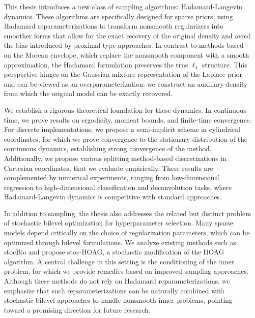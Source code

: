 \documentclass[11pt, twoside]{report}
\begin{document}
This thesis introduces a new class of sampling algorithms: Hadamard-Langevin dynamics. These algorithms are specifically designed for sparse priors, using Hadamard reparameterizations to transform nonsmooth regularizers into smoother forms that allow for the exact recovery of the original density and avoid the bias introduced by proximal-type approaches. In contrast to methods based on the Moreau envelope, which replace the nonsmooth component with a smooth approximation, the Hadamard formulation preserves the true $\ell_1$ structure. This perspective hinges on the Gaussian mixture representation of the Laplace prior and can be viewed as an overparameterization: we construct an auxiliary density from which the original model can be exactly recovered.

We establish a rigorous theoretical foundation for these dynamics. In continuous time, we prove results on ergodicity, moment bounds, and finite-time convergence. For discrete implementations, we propose a semi-implicit scheme in cylindrical coordinates, for which we prove convergence to the stationary distribution of the continuous dynamics, establishing strong convergence of the method. Additionally, we propose various splitting method-based discretizations in Cartesian coordinates, that we evaluate empirically. These results are complemented by numerical experiments, ranging from low-dimensional regression to high-dimensional classification and deconvolution tasks, where Hadamard-Langevin dynamics is competitive with standard approaches.

In addition to sampling, the thesis also addresses the related but distinct problem of stochastic bilevel optimization for hyperparameter selection. Many sparse models depend critically on the choice of regularization parameters, which can be optimized through bilevel formulations. We analyze existing methods such as stocBio and propose stoc-HOAG, a stochastic modification of the HOAG algorithm. A central challenge in this setting is the conditioning of the inner problem, for which we provide remedies based on improved sampling approaches. Although these methods do not rely on Hadamard reparameterizations, we emphasize that such reparameterizations can be naturally combined with stochastic bilevel approaches to handle nonsmooth inner problems, pointing toward a promising direction for future research.
\end{document}
